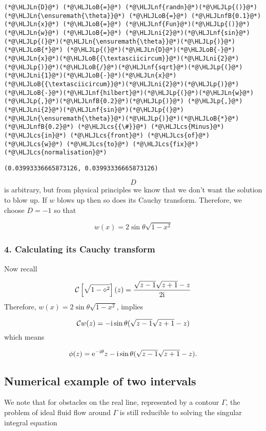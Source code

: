 \documentclass[12pt,landscape]{article}
\newcommand{\HLJLn}[1]{#1}
\newcommand{\HLJLnf}[1]{\textcolor[RGB]{66,102,213}{#1}}
\newcommand{\HLJLnfB}[1]{\textcolor[RGB]{59,151,46}{#1}}
\newcommand{\HLJLni}[1]{\textcolor[RGB]{59,151,46}{#1}}
\newcommand{\HLJLoB}[1]{\textcolor[RGB]{102,102,102}{\textbf{#1}}}
\newcommand{\HLJLp}[1]{#1}
\newcommand{\HLJLcs}[1]{\textcolor[RGB]{153,153,119}{\textit{#1}}}
\def\I{ {\rm i} }
\def\E{ {\rm e} }
\def\CC{ {\cal C} }
\begin{document}
{\begin{lstlisting}
(*@\HLJLn{D}@*) (*@\HLJLoB{=}@*) (*@\HLJLnf{randn}@*)(*@\HLJLp{()}@*)
(*@\HLJLn{\ensuremath{\theta}}@*) (*@\HLJLoB{=}@*) (*@\HLJLnfB{0.1}@*)
(*@\HLJLn{x}@*) (*@\HLJLoB{=}@*) (*@\HLJLnf{Fun}@*)(*@\HLJLp{()}@*)
(*@\HLJLn{w}@*) (*@\HLJLoB{=}@*) (*@\HLJLni{2}@*)(*@\HLJLnf{sin}@*)(*@\HLJLp{(}@*)(*@\HLJLn{\ensuremath{\theta}}@*)(*@\HLJLp{)}@*) (*@\HLJLoB{*}@*) (*@\HLJLp{(}@*)(*@\HLJLn{D}@*)(*@\HLJLoB{-}@*)(*@\HLJLn{x}@*)(*@\HLJLoB{{\textasciicircum}}@*)(*@\HLJLni{2}@*)(*@\HLJLp{)}@*)(*@\HLJLoB{/}@*)(*@\HLJLnf{sqrt}@*)(*@\HLJLp{(}@*)(*@\HLJLni{1}@*)(*@\HLJLoB{-}@*)(*@\HLJLn{x}@*)(*@\HLJLoB{{\textasciicircum}}@*)(*@\HLJLni{2}@*)(*@\HLJLp{)}@*)
(*@\HLJLoB{-}@*)(*@\HLJLnf{hilbert}@*)(*@\HLJLp{(}@*)(*@\HLJLn{w}@*)(*@\HLJLp{,}@*)(*@\HLJLnfB{0.2}@*)(*@\HLJLp{)}@*) (*@\HLJLp{,}@*) (*@\HLJLni{2}@*)(*@\HLJLnf{sin}@*)(*@\HLJLp{(}@*)(*@\HLJLn{\ensuremath{\theta}}@*)(*@\HLJLp{)}@*)(*@\HLJLoB{*}@*)(*@\HLJLnfB{0.2}@*) (*@\HLJLcs{{\#}}@*) (*@\HLJLcs{Minus}@*) (*@\HLJLcs{in}@*) (*@\HLJLcs{front}@*) (*@\HLJLcs{of}@*) (*@\HLJLcs{w}@*) (*@\HLJLcs{to}@*) (*@\HLJLcs{fix}@*) (*@\HLJLcs{normalisation}@*)
\end{lstlisting}

\begin{lstlisting}
(0.03993336665873126, 0.03993336665873126)
\end{lstlisting}


\[
D
\]
is arbitrary, but from physical principles we know that we don't want the solution to blow up. If $w$ blows up then so does its Cauchy transform. Therefore, we choose $D = -1$ so that

\[
w(x) = 2 \sin \theta \sqrt{1-x^2}
\]
\newpage
\subsubsection{4. Calculating its Cauchy transform}
Now recall

\[
\CC\left[{\sqrt{1-\diamond^2}}\right](z) = {\sqrt{z-1} \sqrt{z+1} -z \over 2 \I}
\]
Therefore, $w(x) = 2 \sin \theta \sqrt{1-x^2}$,  implies

\[
\CC w(z) = - \I \sin \theta (\sqrt{z-1} \sqrt{z+1} -z)
\]
which means

\[
\phi(z) = \E^{-\I \theta} z - \I \sin \theta (\sqrt{z-1} \sqrt{z+1} -z).
\]
\newpage
\subsection{Numerical example of two intervals}
We note that for obstacles on the real line, represented by a contour $\Gamma$, the problem of ideal fluid flow around $\Gamma$ is still reducible to solving the singular integral equation

}
\end{document}
